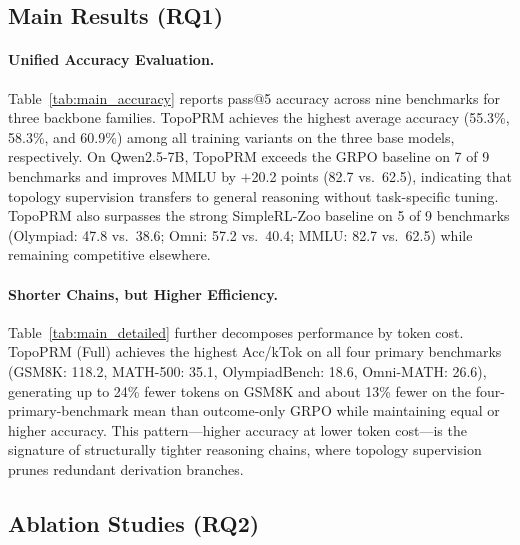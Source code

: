 


\subsection{Main Results (RQ1)}
\label{sec:rq1}

\paragraph{Unified Accuracy Evaluation.}
Table~\ref{tab:main_accuracy} reports pass@5 accuracy across nine benchmarks for three backbone families. TopoPRM achieves the highest average accuracy (55.3\%, 58.3\%, and 60.9\%) among all training variants on the three base models, respectively.
On Qwen2.5-7B, TopoPRM exceeds the GRPO baseline on 7 of 9 benchmarks and improves MMLU by $+$20.2 points (82.7 vs.\ 62.5), indicating that topology supervision transfers to general reasoning without task-specific tuning. TopoPRM also surpasses the strong SimpleRL-Zoo baseline on 5 of 9 benchmarks (Olympiad: 47.8 vs.\ 38.6; Omni: 57.2 vs.\ 40.4; MMLU: 82.7 vs.\ 62.5) while remaining competitive elsewhere.

\paragraph{Shorter Chains, but Higher Efficiency.}
Table~\ref{tab:main_detailed} further decomposes performance by token cost.
TopoPRM (Full) achieves the highest Acc/kTok on all four primary benchmarks (GSM8K: 118.2, MATH-500: 35.1, OlympiadBench: 18.6, Omni-MATH: 26.6), generating up to 24\% fewer tokens on GSM8K and about 13\% fewer on the four-primary-benchmark mean than outcome-only GRPO while maintaining equal or higher accuracy.
This pattern---higher accuracy at lower token cost---is the signature of structurally tighter reasoning chains, where topology supervision prunes redundant derivation branches.

\subsection{Ablation Studies (RQ2)}
\label{sec:rq2}

